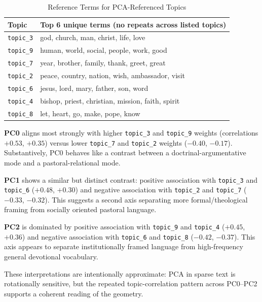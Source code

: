 \documentclass[conference]{IEEEtran}
\begin{document}
\begin{table}[htbp]
\caption{Reference Terms for PCA-Referenced Topics}
\label{tab:pca_topic_terms}
\centering
\footnotesize
\begin{tabular}{lp{}}
\toprule
Topic & Top 6 unique terms (no repeats across listed topics) \\
\midrule
\texttt{topic\_3} & god, church, man, christ, life, love \\
\texttt{topic\_9} & human, world, social, people, work, good \\
\texttt{topic\_7} & year, brother, family, thank, greet, great \\
\texttt{topic\_2} & peace, country, nation, wish, ambassador, visit \\
\texttt{topic\_6} & jesus, lord, mary, father, son, word \\
\texttt{topic\_4} & bishop, priest, christian, mission, faith, spirit \\
\texttt{topic\_8} & let, heart, go, make, pope, know \\
\bottomrule
\end{tabular}
\end{table}

\textbf{PC0} aligns most strongly with higher \texttt{topic\_3} and \texttt{topic\_9} weights (correlations \(+0.53\), \(+0.35\)) versus lower \texttt{topic\_7} and \texttt{topic\_2} weights (\(-0.40\), \(-0.17\)). Substantively, PC0 behaves like a contrast between a doctrinal-argumentative mode and a pastoral-relational mode.

\textbf{PC1} shows a similar but distinct contrast: positive association with \texttt{topic\_3} and \texttt{topic\_6} (\(+0.48\), \(+0.30\)) and negative association with \texttt{topic\_2} and \texttt{topic\_7} (\(-0.33\), \(-0.32\)). This suggests a second axis separating more formal/theological framing from socially oriented pastoral language.

\textbf{PC2} is dominated by positive association with \texttt{topic\_9} and \texttt{topic\_4} (\(+0.45\), \(+0.36\)) and negative association with \texttt{topic\_6} and \texttt{topic\_8} (\(-0.42\), \(-0.37\)). This axis appears to separate institutionally framed language from high-frequency general devotional vocabulary.

These interpretations are intentionally approximate: PCA in sparse text is rotationally sensitive, but the repeated topic-correlation pattern across PC0--PC2 supports a coherent reading of the geometry.
\end{document}
